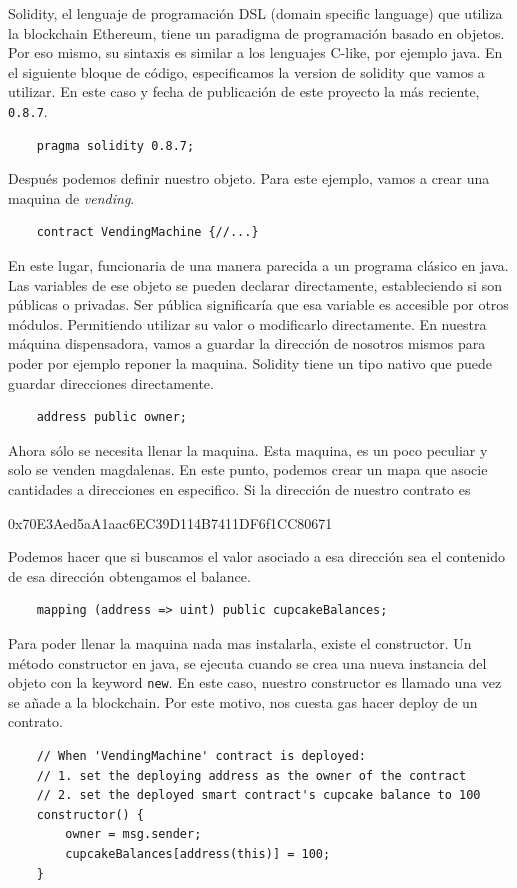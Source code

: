 Solidity, el lenguaje de programación DSL (domain specific language) que utiliza la blockchain Ethereum, tiene un paradigma de programación basado en objetos. Por eso mismo, su sintaxis es similar a los lenguajes C-like, por ejemplo java.
En el siguiente bloque de código, especificamos la version de solidity que vamos a utilizar. En este caso y fecha de publicación de este proyecto la más reciente, \verb|0.8.7|.
\begin{lstlisting}
    pragma solidity 0.8.7;
\end{lstlisting}
Después podemos definir nuestro objeto. Para este ejemplo, vamos a crear una maquina de \textit{vending}.
\begin{lstlisting}
    contract VendingMachine {//...}
\end{lstlisting}
En este lugar, funcionaria de una manera parecida a un programa clásico en java. Las variables de ese objeto se pueden declarar directamente, estableciendo si son públicas o privadas. Ser pública significaría que esa variable es accesible por otros módulos. Permitiendo utilizar su valor o modificarlo directamente.
En nuestra máquina dispensadora, vamos a guardar la dirección de nosotros mismos para poder por ejemplo reponer la maquina. Solidity tiene un tipo nativo que puede guardar direcciones directamente.
\begin{lstlisting}
    address public owner;
\end{lstlisting}
Ahora sólo se necesita llenar la maquina. Esta maquina, es un poco peculiar y solo se venden magdalenas. En este punto, podemos crear un mapa que asocie cantidades a direcciones en especifico.
Si la dirección de nuestro contrato es
\begin{displayquote}
    0x70E3Aed5aA1aac6EC39D114B7411DF6f1CC80671
\end{displayquote}
Podemos hacer que si buscamos el valor asociado a esa dirección sea el contenido de esa dirección obtengamos el balance.
\begin{lstlisting}
    mapping (address => uint) public cupcakeBalances;
\end{lstlisting}
Para poder llenar la maquina nada mas instalarla, existe el constructor. Un método constructor en java, se ejecuta cuando se crea una nueva instancia del objeto con la keyword \verb|new|. En este caso, nuestro constructor es llamado una vez se añade a la blockchain. Por este motivo, nos cuesta gas hacer deploy de un contrato.
\begin{lstlisting}
    // When 'VendingMachine' contract is deployed:
    // 1. set the deploying address as the owner of the contract
    // 2. set the deployed smart contract's cupcake balance to 100
    constructor() {
        owner = msg.sender;
        cupcakeBalances[address(this)] = 100;
    }
\end{lstlisting}
